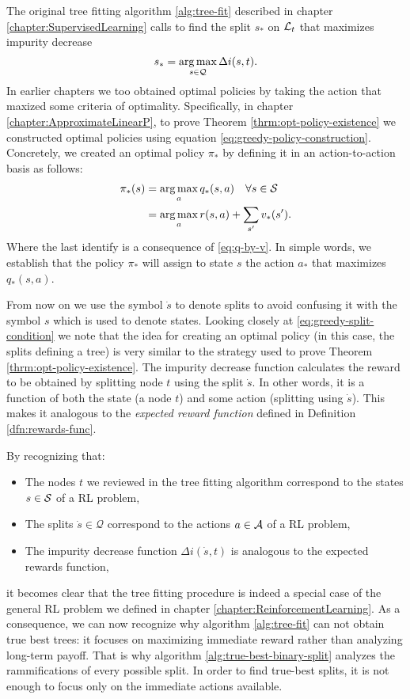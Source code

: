 The original tree fitting algorithm \ref{alg:tree-fit} described in chapter
\ref{chapter:SupervisedLearning} calls to find the split $s_*$ on $\mathcal{L}_t$ that
maximizes impurity decrease
\begin{equation}
    \label{eq:greedy-split-condition}
    s_* = \operatorname*{arg\,max}_{s \in \mathcal{Q}} \Delta i(s, t).
\end{equation}
In earlier chapters we too obtained optimal policies by taking the action that
maxized some criteria of optimality. Specifically, in chapter
\ref{chapter:ApproximateLinearP}, to prove Theorem
\ref{thrm:opt-policy-existence} we constructed optimal policies using equation
\eqref{eq:greedy-policy-construction}. Concretely, we created an optimal policy
$\pi_*$ by defining it in an action-to-action basis as follows:
\begin{align*}
    \pi_{*} (s) &= \operatorname*{arg\,max}_{a} q_{*} (s, a) \quad \forall s \in \mathcal{S} \\
    &= \operatorname*{arg\,max}_a r(s, a) + \sum_{s'} v_* (s').
\end{align*}
Where the last identify is a consequence of \eqref{eq:q-by-v}. In simple words,
we establish that the policy $\pi_*$ will assign to state $s$ the action $a_*$
that maximizes $q_* (s, a)$. 

From now on we use the symbol $\dot{s}$ to denote splits to avoid confusing it
with the symbol $s$ which is used to denote states. Looking closely at
\eqref{eq:greedy-split-condition} we note that the idea for creating an optimal
policy (in this case, the splits defining a tree) is very similar to the
strategy used to prove Theorem \ref{thrm:opt-policy-existence}. The impurity
decrease function calculates the reward to be obtained by splitting node $t$
using the split $\dot{s}$. In other words, it is a function of both the state (a
node $t$) and some action (splitting using $\dot{s}$). This makes it analogous
to the \emph{expected reward function} defined in Definition
\ref{dfn:rewards-func}.

By recognizing that:
\begin{itemize}
    \item The nodes $t$ we reviewed in the tree fitting algorithm correspond to
        the states $s \in \mathcal{S}$ of a RL problem,
    \item The splits $\dot{s} \in \mathcal{Q}$ correspond to the actions $a \in
        \mathcal{A}$ of a RL problem,
    \item The impurity decrease function $\Delta i(\dot{s}, t)$ is analogous to
        the expected rewards function,
\end{itemize}
it becomes clear that the tree fitting procedure is indeed a special case of the
general RL problem we defined in chapter \ref{chapter:ReinforcementLearning}. As
a consequence, we can now recognize why algorithm \ref{alg:tree-fit} can not
obtain true best trees: it focuses on maximizing immediate reward rather than
analyzing long-term payoff. That is why algorithm
\ref{alg:true-best-binary-split} analyzes the rammifications of every possible
split. In order to find true-best splits, it is not enough to focus only on the
immediate actions available.

